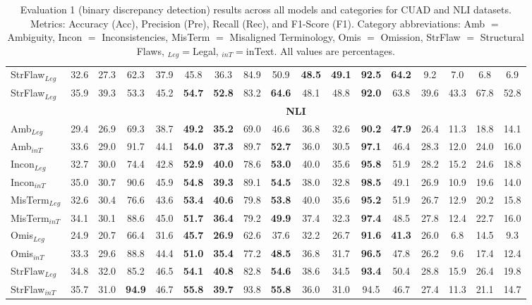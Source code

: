 \documentclass[11pt]{article}
\begin{document}
\begin{table}[h!]
\begin{tabular*}{\textwidth}{@{\extracolsep{\fill}}l|cccc|cccc|cccc|cccc@{}}
StrFlaw$_{Leg}$    & 32.6 & 27.3 & 62.3 & 37.9 & 45.8 & 36.3 & 84.9 & 50.9 & \textbf{48.5} & \textbf{49.1} & \textbf{92.5} & \textbf{64.2} & 9.2 & 7.0 & 6.8 & 6.9 \\
StrFlaw$_{Leg}$   & 35.9 & 39.3 & 53.3 & 45.2 & \textbf{54.7} & \textbf{52.8} & 83.2 & \textbf{64.6} & 48.1 & 48.8 & \textbf{92.0} & 63.8 & 39.6 & 43.3 & 67.8 & 52.8 \\
\cmidrule{1-17}
\rowcolor{lightestgray}
\cellcolor{white} & \multicolumn{16}{c}{\textbf{NLI}} \\
Amb$_{Leg}$      & 29.4 & 26.9 & 69.3 & 38.7 & \textbf{49.2} & \textbf{35.2} & 69.0 & 46.6 & 36.8 & 32.6 & \textbf{90.2} & \textbf{47.9} & 26.4 & 11.3 & 18.8 & 14.1 \\
Amb$_{inT}$    & 33.6 & 29.0 & 91.7 & 44.1 & \textbf{54.0} & \textbf{37.3} & 89.7 & \textbf{52.7} & 36.0 & 30.5 & \textbf{97.1} & 46.4 & 28.3 & 12.0 & 24.0 & 16.0 \\
Incon$_{Leg}$      & 32.7 & 30.0 & 74.4 & 42.8 & \textbf{52.9} & \textbf{40.0} & 78.6 & \textbf{53.0} & 40.0 & 35.6 & \textbf{95.8} & 51.9 & 28.2 & 15.2 & 24.6 & 18.8 \\
Incon$_{inT}$     & 35.0 & 30.7 & 90.6 & 45.9 & \textbf{54.8} & \textbf{39.3} & 89.1 & \textbf{54.5} & 38.0 & 32.8 & \textbf{98.5} & 49.1 & 26.9 & 10.9 & 19.6 & 14.0 \\
MisTerm$_{Leg}$    & 32.6 & 30.4 & 76.6 & 43.6 & \textbf{53.4} & \textbf{40.6} & 79.8 & \textbf{53.8} & 40.0 & 35.6 & \textbf{95.2} & 51.9 & 26.7 & 12.9 & 20.2 & 15.8 \\
MisTerm$_{inT}$  & 34.1 & 30.1 & 88.6 & 45.0 & \textbf{51.7} & \textbf{36.4} & 79.2 & \textbf{49.9} & 37.4 & 32.3 & \textbf{97.4} & 48.5 & 27.8 & 12.4 & 22.7 & 16.0 \\
Omis$_{Leg}$       & 24.9 & 20.7 & 66.4 & 31.6 & \textbf{45.7} & \textbf{26.9} & 62.6 & 37.6 & 32.2 & 26.7 & \textbf{91.6} & \textbf{41.3} & 26.0 & 6.8 & 14.5 & 9.3 \\
Omis$_{inT}$      & 33.3 & 29.6 & 88.8 & 44.4 & \textbf{51.0} & \textbf{35.4} & 77.2 & \textbf{48.5} & 36.8 & 31.7 & \textbf{96.5} & 47.8 & 26.2 & 9.6 & 17.4 & 12.4 \\
StrFlaw$_{Leg}$    & 34.8 & 32.0 & 85.2 & 46.5 & \textbf{54.1} & \textbf{40.8} & 82.8 & \textbf{54.6} & 38.6 & 34.5 & \textbf{93.4} & 50.4 & 28.8 & 15.9 & 26.4 & 19.8 \\
StrFlaw$_{inT}$   & 35.7 & 31.0 & \textbf{94.9} & 46.7 & \textbf{55.8} & \textbf{39.7} & 93.8 & \textbf{55.8} & 36.0 & 31.0 & 94.5 & 46.7 & 27.4 & 11.3 & 21.1 & 14.7 \\
\hline
\end{tabular*}
\caption{Evaluation 1 (binary discrepancy detection) results across all models and categories for CUAD and NLI datasets. Metrics: Accuracy (Acc), Precision (Pre), Recall (Rec), and F1-Score (F1). Category abbreviations: Amb $=$ Ambiguity, Incon $=$ Inconsistencies, MisTerm $=$ Misaligned Terminology, Omis $=$ Omission, StrFlaw $=$ Structural Flaws, $_{Leg}= $Legal, $_{inT}= $inText. All values are percentages.}
\label{tab:eval1_full_results}
\end{table}
\end{document}
